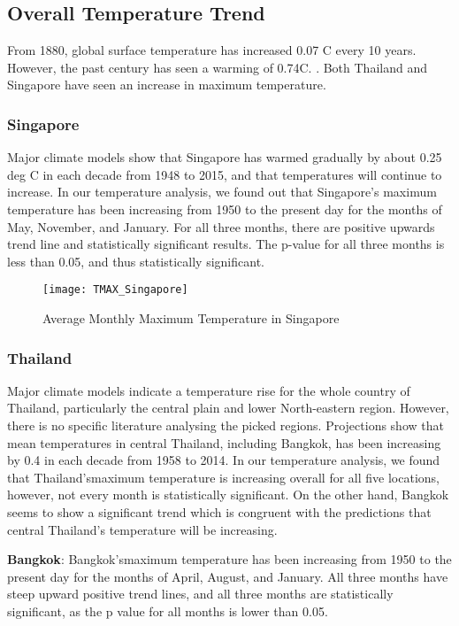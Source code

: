 \subsection{Overall Temperature Trend}
From 1880, global surface temperature has increased 0.07 \degree C every 10 years. However, the past century has seen a warming of 0.74\degree C. \citep{tempincrease}. Both Thailand and Singapore have seen an increase in maximum temperature.

\subsubsection{Singapore}
Major climate models show that Singapore has warmed gradually by about 0.25 deg C in each decade from 1948 to 2015, and that temperatures will continue to increase. In our temperature analysis, we found out that Singapore's maximum temperature has been increasing from 1950 to the present day for the months of May, November, and January. For all three months, there are positive upwards trend line and statistically significant results. The p-value for all three months is less than 0.05, and thus statistically significant. \citep{singaporeweather}

\begin{figure}[h!]
\centering
  \texttt{[image: TMAX\_Singapore]}
  \caption{Average Monthly Maximum Temperature in Singapore}
  \label{fig:TMAX_Singapore}
\end{figure}

\subsubsection{Thailand}

Major climate models indicate a temperature rise for the whole country of Thailand, particularly the central plain and lower North-eastern region. However, there is no specific literature analysing the picked regions. Projections show that mean temperatures in central Thailand, including Bangkok, has been increasing by 0.4 in each decade from 1958 to 2014. In our temperature analysis, we found that Thailand'smaximum temperature is increasing overall for all five locations, however, not every month is statistically significant. On the other hand, Bangkok seems to show a significant trend which is congruent with the predictions that central Thailand's temperature will be increasing.  \citep{bkkweather}

\textbf{Bangkok}: Bangkok'smaximum temperature has been increasing from 1950 to the present day for the months of April, August, and January. All three months have steep upward positive trend lines, and all three months are statistically significant, as the p value for all months is lower than 0.05.

